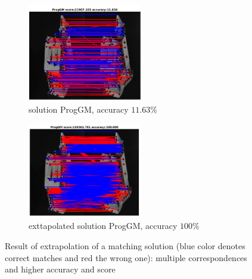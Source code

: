 \begin{figure}[h]\centering
		\begin{subfigure}[b]{0.45\textwidth}
			\centering
			\includegraphics[width=5cm]{"chapter3/fig/HouseSeq2/anchor_descr/using_cpd_afftrafo/solution/fi_1_ProgGM"} 
			\caption{\scriptsize solution ProgGM, accuracy $11.63\%$}
		\end{subfigure} 
		\begin{subfigure}[b]{0.45\textwidth}
			\centering
			\includegraphics[width=5cm]{"chapter3/fig/HouseSeq2/anchor_descr/using_cpd_afftrafo/ext_solution/fi_1_ProgGM"} 
			\caption{\scriptsize exttapolated solution ProgGM, accuracy $100\%$}
		\end{subfigure}
	\caption[Result of the extrapolation of a matching solution]{Result of extrapolation of a matching solution (blue color denotes correct matches and red the wrong one): multiple correspondences and higher accuracy and score} \label{fig:sol_ext}
\end{figure}

